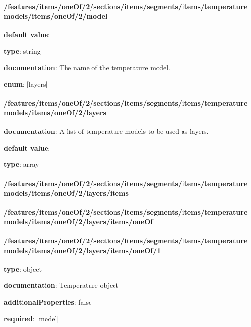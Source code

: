 \paragraph{/features/items/oneOf/2/sections/items/segments/items/temperature models/items/oneOf/2/model} \begin{itemized}
\item {\bf default value}: 
\item {\bf type}: string
\item {\bf documentation}: The name of the temperature model.
\item {\bf enum}: [layers]\end{itemized}\paragraph{/features/items/oneOf/2/sections/items/segments/items/temperature models/items/oneOf/2/layers} \begin{itemized}
\item {\bf documentation}: A list of temperature models to be used as layers.
\item {\bf default value}: 
\item {\bf type}: array
\paragraph{/features/items/oneOf/2/sections/items/segments/items/temperature models/items/oneOf/2/layers/items} \begin{itemized}
\end{itemized}\end{itemized}\paragraph{/features/items/oneOf/2/sections/items/segments/items/temperature models/items/oneOf/2/layers/items/oneOf} \begin{itemized}
\end{itemized}\paragraph{/features/items/oneOf/2/sections/items/segments/items/temperature models/items/oneOf/2/layers/items/oneOf/1} \begin{itemized}
\item {\bf type}: object
\item {\bf documentation}: Temperature object
\item {\bf additionalProperties}: false
\item {\bf required}: [model]\end{itemized}
